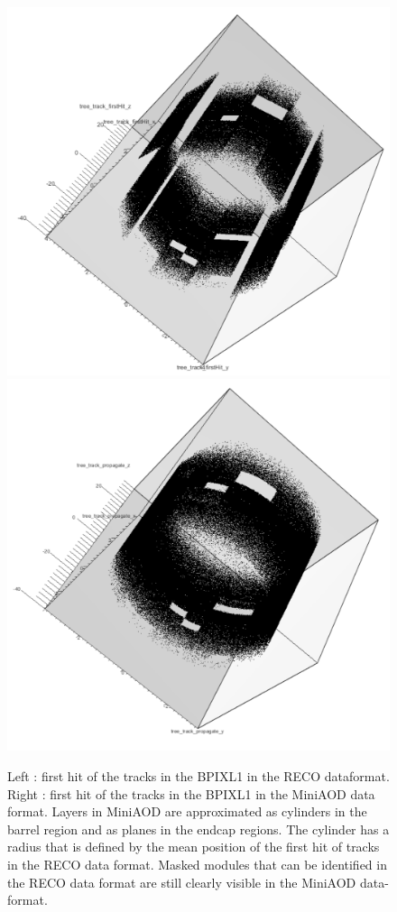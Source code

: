 \documentclass{cernatlasnote}
\begin{document}
\begin{appendices}
\begin{figure}
    \centering
    \includegraphics[width=0.5\linewidth]{images/FirstHit/BPIXL1RECO2018.pdf}\includegraphics[width=0.5\linewidth]{images/FirstHit/BPIXL1PROPA2018.pdf}
    \caption{Left : first hit of the tracks in the BPIXL1 in the RECO dataformat. Right : first hit of the tracks in the BPIXL1 in the MiniAOD data format. Layers in MiniAOD are approximated as cylinders in the barrel region and as planes in the endcap regions. The cylinder has a radius that is defined by the mean position of the first hit of tracks in the RECO data format. Masked modules that can be identified in the RECO data format are still clearly visible in the MiniAOD data-format.}
    \label{fig:BPIXL1PROPA}
\end{figure}


\end{appendices}
\end{document}
